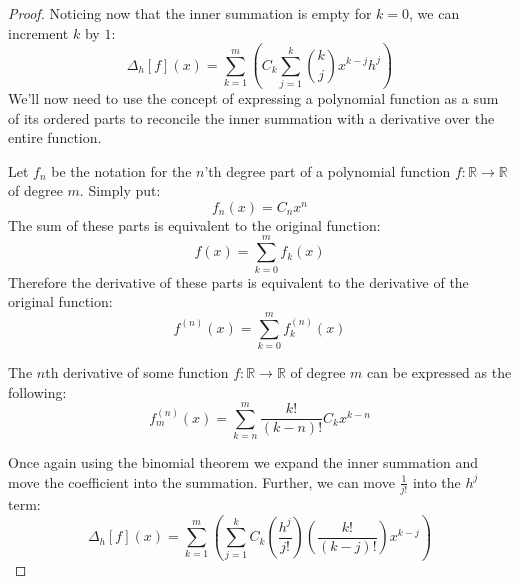 \begin{proof}
  Noticing now that the inner summation is empty for $k=0$, we can increment $k$ by $1$:
  \begin{equation}
    \label{eq:fdo-simplification-6}
    \Delta_{h}\left[f\right]\left(x\right)=\sum_{k=1}^{m}\left(C_k\sum_{j=1}^{k}{k\choose{j}}x^{k-j}h^j\right)
  \end{equation}
  We'll now need to use the concept of expressing a polynomial function as a sum of its ordered parts to reconcile the inner summation with a derivative over the entire function.
  \begin{definition}
    \label{def:ordered-part-definition}
    Let $f_n$ be the notation for the $n$'th degree part of a polynomial function $f:\mathbb{R}\to\mathbb{R}$ of degree $m$. Simply put:
    \begin{equation}
      \label{eq:ordered-part-definition}
      f_n\left(x\right)=C_nx^n
    \end{equation}
    The sum of these parts is equivalent to the original function:
    \begin{equation}
      \label{eq:ordered-part-definition-2}
      f\left(x\right)=\sum_{k=0}^{m}f_k\left(x\right)
    \end{equation}
    Therefore the derivative of these parts is equivalent to the derivative of the original function:
    \begin{equation}
      \label{eq:ordered-part-definition-3}
      f^{\left(n\right)}\left(x\right)=\sum_{k=0}^{m}f^{\left(n\right)}_k\left(x\right)
    \end{equation}
  \end{definition}
  \begin{definition}
    \label{def:nth-derivative-definition}
    The $n$th derivative of some function $f:\mathbb{R}\to\mathbb{R}$ of degree $m$ can be expressed as the following:
    \begin{equation}
      \label{eq:nth-derivative-definition}
      f^{\left(n\right)}_m\left(x\right)=\sum_{k=n}^{m}\frac{k!}{\left(k-n\right)!}C_kx^{k-n}
    \end{equation}
  \end{definition}
  Once again using the binomial theorem we expand the inner summation and move the coefficient into the summation. Further, we can move $\frac{1}{j!}$ into the $h^j$ term:
  \begin{equation}
    \label{eq:fdo-simplification-7}
    \Delta_{h}\left[f\right]\left(x\right)=\sum_{k=1}^{m}\left(\sum_{j=1}^{k}C_k\left(\frac{h^j}{j!}\right)\left(\frac{k!}{\left(k-j\right)!}\right)x^{k-j}\right)

\end{equation}
\end{proof}
